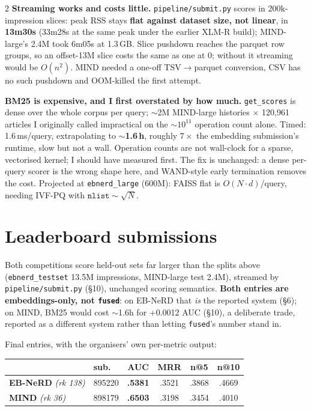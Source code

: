 \documentclass[10pt,a4paper]{article}
\newcommand{\tabsize}{\footnotesize}
\begin{document}
\begin{multicols}{2}
\textbf{Streaming works and costs little.} \texttt{pipeline/submit.py} scores in 200k-impression
slices: peak RSS stays \textbf{flat against dataset size, not linear}, in \textbf{13m30s} (33m28s at
the same peak under the earlier XLM-R build); MIND-large's 2.4M took 6m05s at 1.3\,GB. Slice pushdown
reaches the parquet row groups, so an offset-13M slice costs the same as one at 0; without it streaming
would be $O(n^2)$. MIND needed a one-off TSV$\rightarrow$parquet conversion, CSV has no such pushdown
and OOM-killed the first attempt.

\textbf{BM25 is expensive, and I first overstated by how much.} \texttt{get\_scores} is dense over the
whole corpus per query; ${\sim}$2M MIND-large histories $\times$ 120,961 articles I originally called
impractical on the ${\sim}10^{11}$ operation count alone. Timed: 1.6\,ms/query, extrapolating to
\textbf{${\sim}$1.6\,h}, roughly $7\times$ the embedding submission's runtime, slow but not a wall.
Operation counts are not wall-clock for a sparse, vectorised kernel; I should have measured first. The
fix is unchanged: a dense per-query scorer is the wrong shape here, and WAND-style early termination
removes the cost. Projected at \texttt{ebnerd\_large} (600M): FAISS flat is $O(N\!\cdot\!d)$/query,
needing IVF-PQ with $\texttt{nlist} \sim \sqrt{N}$.

\section{Leaderboard submissions}

Both competitions score held-out sets far larger than the splits above (\texttt{ebnerd\_testset} 13.5M
impressions, MIND-large test 2.4M), streamed by \texttt{pipeline/submit.py} (\S10), unchanged scoring
semantics. \textbf{Both entries are embeddings-only, not \texttt{fused}}: on EB-NeRD that \emph{is} the
reported system (\S6); on MIND, BM25 would cost ${\sim}$1.6h for +0.0012 AUC (\S10), a deliberate
trade, reported as a different system rather than letting \texttt{fused}'s number stand in.

Final entries, with the organisers' own per-metric output:

\begin{center}\tabsize
\begin{tabular}{@{}llcccc@{}}
\toprule
 & sub. & AUC & MRR & n@5 & n@10 \\
\midrule
\textbf{EB-NeRD} \emph{(rk 138)} & 895220 & \textbf{.5381} & .3521 & .3868 & .4669 \\
\textbf{MIND} \emph{(rk 36)} & 898179 & \textbf{.6503} & .3198 & .3454 & .4010 \\
\bottomrule
\end{tabular}
\end{center}


\end{multicols}
\end{document}
